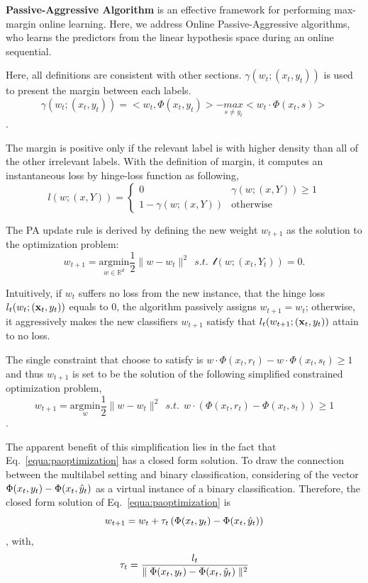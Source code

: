 \vspace{3ex}
\textbf{Passive-Aggressive Algorithm}\cite{crammer2006online} is an effective framework for performing max-margin online learning.  Here, we address Online Passive-Aggressive algorithms, who learns the predictors from the linear hypothesis space during an online sequential. 

Here, all definitions are consistent with other sections. $\gamma\left(w_t;(x_t,y_t)\right)$ is used to present the margin between each labels.
\[\gamma\left(w_t;(x_t,y_t)\right)  = <w_t, \Phi(x_t,y_t)>-\underset{s\neq y_t}{max } <w_t\cdot \Phi(x_t,s)>\].

The margin is positive only if the relevant label is with higher density than all of the other irrelevant labels. With the definition of margin, it computes an instantaneous loss by hinge-loss function as following,
\begin{equation}
\label{equa:hingeloss}
l(w;(x,Y)) = 
\begin{cases}
0 & \gamma(w;(x,Y))\geqslant 1 \\ 
1-\gamma(w;(x,Y)) & \text{otherwise} 
\end{cases}
\end{equation}

The PA update rule is derived by defining the new weight $w_{t+1}$ as the solution to the optimization problem:
\begin{equation}
\label{equa:paconstraint}
w_{t+1} = \underset{w\in \mathbb{R}^d}{\text{argmin}} \frac{1}{2}\parallel{w-w_t}\parallel^2 \ \ s.t. \ \ \mathscr{l}(w;(x_t,Y_t)) = 0.
\end{equation}

Intuitively, if $w_t$ suffers no loss from the new instance, that the hinge loss $l_t(w_t;(\mathbf{x}_t,y_t))$ equals to $0$, the algorithm passively assigns $w_{t+1} = w_t$; otherwise, it aggressively makes the new classifiers $w_{t+1}$ satisfy that $l_t(w_{t+1};(\mathbf{x}_t,y_t))$ attain to no loss. 

The single constraint that choose to satisfy is $w\cdot\Phi(x_t,r_t)-w\cdot\Phi(x_t,s_t) \geqslant 1$ and thus $w_{t+1}$ is set to be the solution of the following simplified constrained optimization problem,
\begin{equation}
\label{equa:paoptimization}
w_{t+1} = \underset{w}{\text{argmin}}\frac{1}{2}\parallel{w-w_t}\parallel^2 \ \ s.t. \ \ w\cdot(\Phi(x_t,r_t)-\Phi(x_t,s_t))\geqslant 1
\end{equation}. 

The apparent benefit of this simplification lies in the fact that Eq.~\ref{equa:paoptimization} has a closed form solution. To draw the connection between the multilabel setting and binary classification,  considering of the vector $\Phi(x_t,y_t)-\Phi(x_t,\hat{y}_t)$ as a virtual instance of a binary classification. Therefore, the closed form solution of Eq.~\ref{equa:paoptimization} is 
\begin{equation}
\label{equa:paupdate}
w_{t+1}=w_t +\tau_t \left( \Phi(x_t,y_t)-\Phi(x_t,\hat{y}_t)\right)
\end{equation},
with,
\[\tau_t = \frac{l_t}{\parallel{\Phi(x_t,y_t)-\Phi(x_t,\hat{y}_t)}\parallel^2}\]

